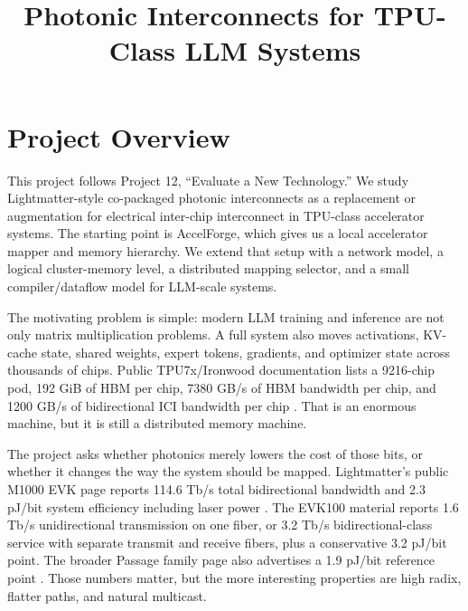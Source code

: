 \documentclass[conference,onecolumn]{IEEEtran}
\newcommand{\pjbit}{pJ/bit}
\newcommand{\tbps}{Tb/s}
\newcommand{\gbs}{GB/s}
\begin{document}
\title{Photonic Interconnects for TPU-Class LLM Systems}

\author{
\and
{}
}

\maketitle

\section{Project Overview}

This project follows Project 12, ``Evaluate a New Technology.'' We study
Lightmatter-style co-packaged photonic interconnects as a replacement or
augmentation for electrical inter-chip interconnect in TPU-class accelerator
systems. The starting point is AccelForge, which gives us a local accelerator
mapper and memory hierarchy. We extend that setup with a network model,
a logical cluster-memory level, a distributed mapping selector, and a small
compiler/dataflow model for LLM-scale systems.

The motivating problem is simple: modern LLM training and inference are not
only matrix multiplication problems. A full system also moves activations,
KV-cache state, shared weights, expert tokens, gradients, and optimizer state
across thousands of chips. Public TPU7x/Ironwood documentation lists a
9216-chip pod, 192 GiB of HBM per chip, 7380 \gbs{} of HBM bandwidth per chip,
and 1200 \gbs{} of bidirectional ICI bandwidth per chip \cite{tpu7x}. That is
an enormous machine, but it is still a distributed memory machine.

The project asks whether photonics merely lowers the cost of those bits, or
whether it changes the way the system should be mapped. Lightmatter's public
M1000 EVK page reports 114.6 \tbps{} total bidirectional bandwidth and
2.3 \pjbit{} system efficiency including laser power \cite{m1000}. The
EVK100 material reports 1.6 \tbps{} unidirectional transmission on one fiber,
or 3.2 \tbps{} bidirectional-class service with separate transmit and receive
fibers, plus a conservative 3.2 \pjbit{} point. The broader Passage family page
also advertises a 1.9 \pjbit{} reference point \cite{evk100,passage}. Those
numbers matter, but the more interesting properties are high radix, flatter
paths, and natural multicast.
\end{document}

